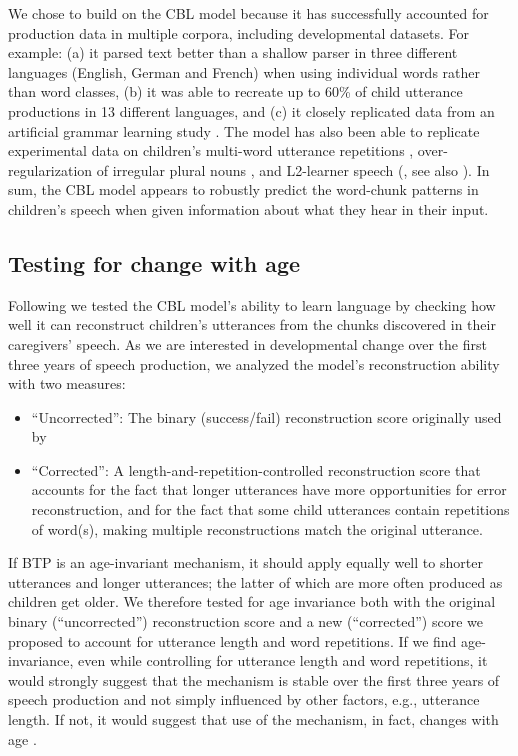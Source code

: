 \documentclass{article}
\begin{document}
We chose to build on the CBL model because it has successfully accounted for production data in multiple corpora, including developmental datasets. For example: (a) it parsed text better than a shallow parser in three different languages (English, German and French) when using individual words rather than word classes, (b) it was able to recreate up to 60\% of child utterance productions in 13 different languages, and (c) it closely replicated data from an artificial grammar learning study \cite{mccauley2011learning, saffran2002constraints}. The model has also been able to replicate experimental data on children's multi-word utterance repetitions \cite{bannard2008stored}, over-regularization of irregular plural nouns \cite{arnon2011brush}, and L2-learner speech (, see also ). In sum, the CBL model appears to robustly predict the word-chunk patterns in children's speech when given information about what they hear in their input.

\subsection{Testing for change with age}
Following  we tested the CBL model's ability to learn language by checking how well it can reconstruct children's utterances from the chunks discovered in their caregivers' speech. As we are interested in developmental change over the first three years of speech production, we analyzed the model's reconstruction ability with two measures:

\begin{itemize}
    \item ``Uncorrected'': The binary (success/fail) reconstruction score originally used by 
    \item ``Corrected'': A length-and-repetition-controlled reconstruction score that accounts for the fact that longer utterances have more opportunities for error reconstruction, and for the fact that some child utterances contain repetitions of word(s), making multiple reconstructions match the original utterance.
\end{itemize}

If BTP is an age-invariant mechanism, it should apply equally well to shorter utterances and  longer utterances; the latter of which are more often produced as children get older. We therefore tested for age invariance both with the original binary (``uncorrected'') reconstruction score and a new (``corrected'') score we proposed to account for utterance length and word repetitions. If we find age-invariance, even while controlling for utterance length and word repetitions, it would strongly suggest that the mechanism is stable over the first three years of speech production and not simply influenced by other factors, e.g., utterance length. If not, it would suggest that use of the mechanism, in fact, changes with age \cite{bannard2009modeling, tomasello2003constructing, yang2016price}.
\end{document}
